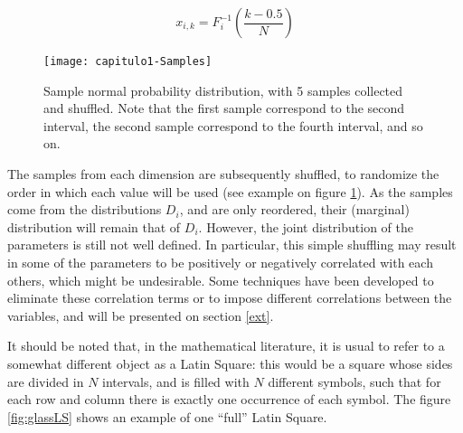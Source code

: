 \begin{equation}
	x_{i,k} = F_i^{-1}\left( \frac{k-0.5}{N}\right)
	\label{inverseCDF}
\end{equation}




\begin{figure}[htpb]
	\begin{center}
\texttt{[image: capitulo1-Samples]}
	\end{center}
	\caption{Sample normal probability distribution, with 5 samples 
	collected and shuffled. Note that the first sample correspond to the 
	second interval, the second sample correspond to the fourth interval,
	and so on.}
	\label{fig:Samples}
\end{figure}

The samples from each dimension are subsequently shuffled, to randomize
the order in which each value will be used
(see example on figure \ref{fig:Samples}).
As the samples come from the distributions $D_i$, and are only reordered, their
(marginal) distribution 
will remain that of $D_i$. However, the joint distribution
of the parameters is still not well defined. In particular, this simple shuffling
may result in some of the parameters to be positively or negatively correlated with
each others, which might be undesirable. Some techniques have been developed to
eliminate these correlation terms or to impose different correlations between the
variables, and will be presented on section \ref{ext}.

It should be noted that, in the mathematical literature, it is usual to refer 
to a somewhat different object as a Latin Square: this would be a square whose 
sides are divided in $N$ intervals, and is filled with $N$ different symbols, 
such that for each row and column there is exactly one occurrence of each 
symbol. The figure \ref{fig:glassLS} shows an example of one ``full'' Latin 
Square.


